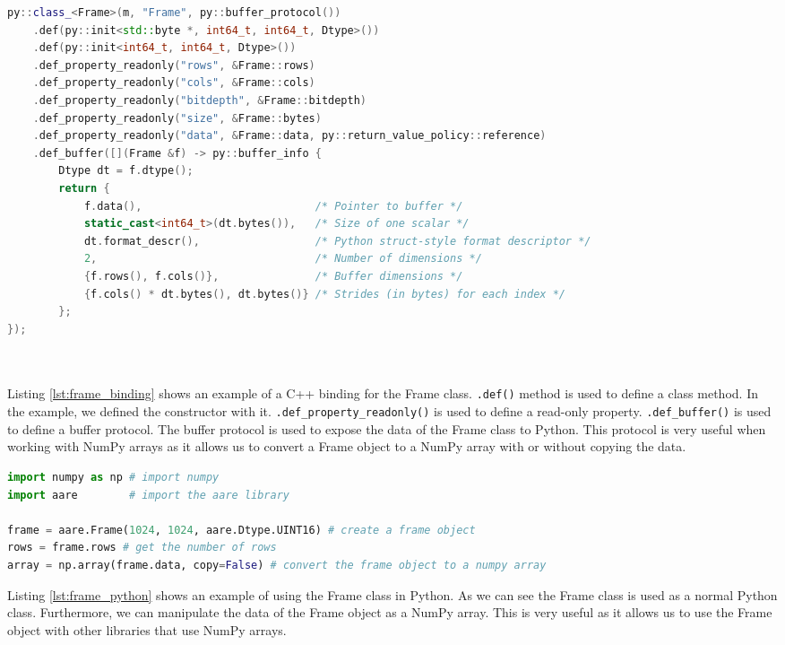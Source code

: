 \begin{spacing}{1.2}
    \begin{lstlisting}[language=C++, caption=Example of a C++ binding for the Frame class,label=lst:frame_binding]
py::class_<Frame>(m, "Frame", py::buffer_protocol())
    .def(py::init<std::byte *, int64_t, int64_t, Dtype>())
    .def(py::init<int64_t, int64_t, Dtype>())
    .def_property_readonly("rows", &Frame::rows)
    .def_property_readonly("cols", &Frame::cols)
    .def_property_readonly("bitdepth", &Frame::bitdepth)
    .def_property_readonly("size", &Frame::bytes)
    .def_property_readonly("data", &Frame::data, py::return_value_policy::reference)
    .def_buffer([](Frame &f) -> py::buffer_info {
        Dtype dt = f.dtype();
        return {
            f.data(),                           /* Pointer to buffer */
            static_cast<int64_t>(dt.bytes()),   /* Size of one scalar */
            dt.format_descr(),                  /* Python struct-style format descriptor */
            2,                                  /* Number of dimensions */
            {f.rows(), f.cols()},               /* Buffer dimensions */
            {f.cols() * dt.bytes(), dt.bytes()} /* Strides (in bytes) for each index */
        };
});

        
    \end{lstlisting}

    Listing \ref{lst:frame_binding} shows an example of a C++ binding for the Frame class.
    \lstinline|.def()| method is used to define a class method. In the example, we defined 
    the constructor with it. \lstinline|.def_property_readonly()| is used to define a read-only property.
    \lstinline|.def_buffer()| is used to define a buffer protocol. The buffer protocol is used to expose
    the data of the Frame class to Python. This protocol is very useful when working with NumPy arrays 
    as it allows us to convert a Frame object to a NumPy array with or without copying the data.\\

    \begin{lstlisting}[language=Python, caption=Example of using the Frame class in Python,label=lst:frame_python]
import numpy as np # import numpy
import aare        # import the aare library

frame = aare.Frame(1024, 1024, aare.Dtype.UINT16) # create a frame object
rows = frame.rows # get the number of rows
array = np.array(frame.data, copy=False) # convert the frame object to a numpy array
    \end{lstlisting}

    Listing \ref{lst:frame_python} shows an example of using the Frame class in Python.
    As we can see the Frame class is used as a normal Python class. Furthermore, we can 
    manipulate the data of the Frame object as a NumPy array. This is very useful as it allows
    us to use the Frame object with other libraries that use NumPy arrays.\\



\end{spacing}
